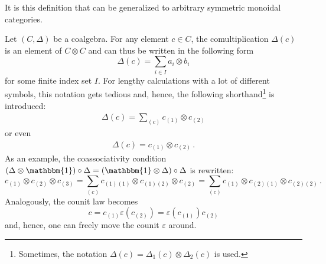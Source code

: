 
    \begin{remark}
        It is this definition that can be generalized to arbitrary symmetric monoidal categories.
    \end{remark}

    \begin{notation}\label{nca:sweedler_notation}
        Let $(C,\Delta)$ be a coalgebra. For any element $c\in C$, the comultiplication $\Delta(c)$ is an element of $C\otimes C$ and can thus be written in the following form \[\Delta(c) = \sum_{i\in I}a_i\otimes b_i\] for some finite index set $I$. For lengthy calculations with a lot of different symbols, this notation gets tedious and, hence, the following shorthand\footnote{Sometimes, the notation $\Delta(c) = \Delta_1(c)\otimes\Delta_2(c)$ is used.} is introduced:
        \begin{gather}
            \Delta(c) = \sum_{(c)}c_{(1)}\otimes c_{(2)}
        \end{gather}
        or even
        \begin{gather}
            \Delta(c) = c_{(1)}\otimes c_{(2)}\,.
        \end{gather}
        As an example, the coassociativity condition $(\Delta\otimes\mathbbm{1})\circ\Delta = (\mathbbm{1}\otimes\Delta)\circ\Delta$ is rewritten: \[c_{(1)}\otimes c_{(2)}\otimes c_{(3)} = \sum_{(c)} c_{(1)(1)}\otimes c_{(1)(2)}\otimes c_{(2)} = \sum_{(c)} c_{(1)}\otimes c_{(2)(1)}\otimes c_{(2)(2)}\,.\] Analogously, the counit law becomes \[c = c_{(1)}\varepsilon(c_{(2)}) = \varepsilon(c_{(1)})c_{(2)}\] and, hence, one can freely move the counit $\varepsilon$ around.
    \end{notation}

